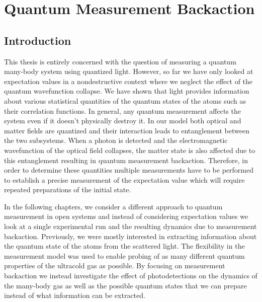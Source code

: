 
\chapter{Quantum Measurement Backaction}  
\label{chap:backaction}

\ifpdf
    \graphicspath{{Chapter4/Figs/Raster/}{Chapter4/Figs/PDF/}{Chapter4/Figs/}}
\else
    \graphicspath{{Chapter4/Figs/Vector/}{Chapter4/Figs/}}
\fi



\section{Introduction}

This thesis is entirely concerned with the question of measuring a
quantum many-body system using quantized light. However, so far we
have only looked at expectation values in a nondestructive context
where we neglect the effect of the quantum wavefunction collapse. We
have shown that light provides information about various statistical
quantities of the quantum states of the atoms such as their
correlation functions. In general, any quantum measurement affects the
system even if it doesn't physically destroy it. In our model both
optical and matter fields are quantized and their interaction leads to
entanglement between the two subsystems. When a photon is detected and
the electromagnetic wavefunction of the optical field collapses, the
matter state is also affected due to this entanglement resulting in
quantum measurement backaction. Therefore, in order to determine these
quantities multiple measurements have to be performed to establish a
precise measurement of the expectation value which will require
repeated preparations of the initial state.

In the following chapters, we consider a different approach to quantum
measurement in open systems and instead of considering expectation
values we look at a single experimental run and the resulting dynamics
due to measurement backaction. Previously, we were mostly interested
in extracting information about the quantum state of the atoms from
the scattered light. The flexibility in the measurement model was used
to enable probing of as many different quantum properties of the
ultracold gas as possible. By focusing on measurement backaction we
instead investigate the effect of photodetections on the dynamics of
the many-body gas as well as the possible quantum states that we can
prepare instead of what information can be extracted.

